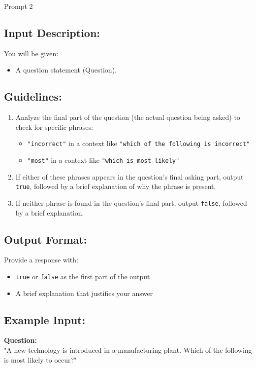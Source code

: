 \begin{promptbox}{Prompt 2}
\subsection*{Input Description:}
You will be given:
\begin{itemize}
    \item A question statement (Question).
\end{itemize}

\subsection*{Guidelines:}
\begin{enumerate}
    \item Analyze the final part of the question (the actual question being asked) to check for specific phrases:
    \begin{itemize}
        \item \texttt{"incorrect"} in a context like \texttt{"which of the following is incorrect"}
        \item \texttt{"most"} in a context like \texttt{"which is most likely"}
    \end{itemize}
    
    \item If either of these phrases appears in the question's final asking part, output \texttt{true}, followed by a brief explanation of why the phrase is present.
    
    \item If neither phrase is found in the question's final part, output \texttt{false}, followed by a brief explanation.
\end{enumerate}

\subsection*{Output Format:}
Provide a response with:
\begin{itemize}
    \item \texttt{true} or \texttt{false} as the first part of the output
    \item A brief explanation that justifies your answer
\end{itemize}

\subsection*{Example Input:}
\textbf{Question:} \\
"A new technology is introduced in a manufacturing plant. Which of the following is most likely to occur?"


\end{promptbox}
